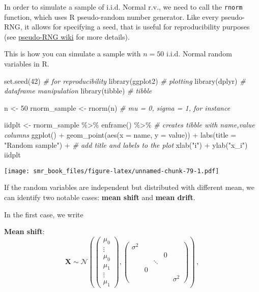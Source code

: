 \documentclass[
  oneside]{book}
\newenvironment{Shaded}{\begin{snugshade}}{\end{snugshade}}
\newcommand{\AttributeTok}[1]{\textcolor[rgb]{0.77,0.63,0.00}{#1}}
\newcommand{\CommentTok}[1]{\textcolor[rgb]{0.56,0.35,0.01}{\textit{#1}}}
\newcommand{\DecValTok}[1]{\textcolor[rgb]{0.00,0.00,0.81}{#1}}
\newcommand{\FunctionTok}[1]{\textcolor[rgb]{0.00,0.00,0.00}{#1}}
\newcommand{\NormalTok}[1]{#1}
\newcommand{\OtherTok}[1]{\textcolor[rgb]{0.56,0.35,0.01}{#1}}
\newcommand{\SpecialCharTok}[1]{\textcolor[rgb]{0.00,0.00,0.00}{#1}}
\newcommand{\StringTok}[1]{\textcolor[rgb]{0.31,0.60,0.02}{#1}}
\begin{document}
In order to simulate a sample of i.i.d. Normal r.v.,
we need to call the \texttt{rnorm} function, which uses R pseudo-random number generator.
Like every pseudo-RNG, it allows for specifying a seed, that
is useful for reproducibility purposes
(see \href{https://en.wikipedia.org/wiki/Pseudorandom_number_generator}{pseudo-RNG wiki} for
more details).

This is how you can simulate a
sample with \(n = 50\) i.i.d. Normal random variables in R.

\begin{Shaded}
\begin{Highlighting}[]
\FunctionTok{set.seed}\NormalTok{(}\DecValTok{42}\NormalTok{) }\CommentTok{\# for reproducibility}
\FunctionTok{library}\NormalTok{(ggplot2) }\CommentTok{\# plotting}
\FunctionTok{library}\NormalTok{(dplyr) }\CommentTok{\# dataframe manipulation}
\FunctionTok{library}\NormalTok{(tibble) }\CommentTok{\# tibble}

\NormalTok{n }\OtherTok{\textless{}{-}} \DecValTok{50}
\NormalTok{rnorm\_sample }\OtherTok{\textless{}{-}} \FunctionTok{rnorm}\NormalTok{(n) }\CommentTok{\# mu = 0, sigma = 1, for instance}

\NormalTok{iidplt }\OtherTok{\textless{}{-}}\NormalTok{ rnorm\_sample }\SpecialCharTok{\%\textgreater{}\%}
  \FunctionTok{enframe}\NormalTok{() }\SpecialCharTok{\%\textgreater{}\%} \CommentTok{\# creates tibble with name,value columns}
  \FunctionTok{ggplot}\NormalTok{() }\SpecialCharTok{+}
  \FunctionTok{geom\_point}\NormalTok{(}\FunctionTok{aes}\NormalTok{(}\AttributeTok{x =}\NormalTok{ name, }\AttributeTok{y =}\NormalTok{ value)) }\SpecialCharTok{+}
  \FunctionTok{labs}\NormalTok{(}\AttributeTok{title =} \StringTok{"Random sample"}\NormalTok{) }\SpecialCharTok{+} \CommentTok{\# add title and labels to the plot}
  \FunctionTok{xlab}\NormalTok{(}\StringTok{"i"}\NormalTok{) }\SpecialCharTok{+}
  \FunctionTok{ylab}\NormalTok{(}\StringTok{"x\_i"}\NormalTok{)}
\NormalTok{iidplt}
\end{Highlighting}
\end{Shaded}

\texttt{[image: smr\_book\_files/figure-latex/unnamed-chunk-79-1.pdf]}

If the random variables are independent but distributed with different mean,
we can identify two notable cases: \textbf{mean shift} and \textbf{mean drift}.

In the first case, we write

\textbf{Mean shift}:
\[
\mathbf{X} \sim \mathcal{N}\left(
\begin{pmatrix}
\mu_0 \\ \vdots \\ \mu_0 \\ \mu_1 \\ \vdots \\ \mu_1
\end{pmatrix}, 
\begin{pmatrix}
\sigma^2 & & & & \\
 & & & 0 & \\
 & & \ddots & &  \\
 & 0 & & & \\
 & & & & \sigma^2
\end{pmatrix}
\right)\,,
\]
\end{document}
